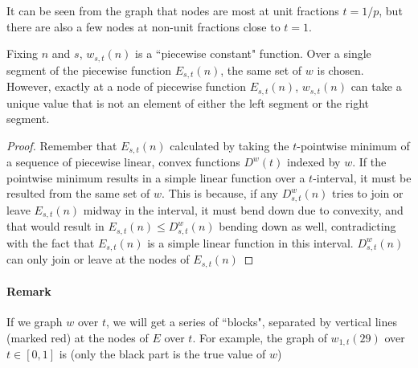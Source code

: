 \documentclass[]{article}
\begin{document}
It can be seen from the graph that nodes are most at unit fractions $t = 1/p$, but there are also a few nodes at non-unit fractions close to $t=1$.
\vspace{1cm}
\begin{lemma}[$w$ segment]
	Fixing $n$ and $s$, $w_{s,t}(n)$ is a ``piecewise constant" function. Over a single segment of the piecewise function $E_{s,t}(n)$, the same set of $w$ is chosen. However, exactly at a node of piecewise function $E_{s,t}(n)$, $w_{s,t}(n)$ can take a unique value that is not an element of either the left segment or the right segment.
\end{lemma}
\begin{proof}
	Remember that $E_{s,t}(n)$ calculated by taking the $t$-pointwise minimum of a sequence of piecewise linear, convex functions $D^w(t)$ indexed by $w$. If the pointwise minimum results in a simple linear function over a $t$-interval, it must be resulted from the same set of $w$. This is because, if any $D^w_{s,t}(n)$ tries to join or leave $E_{s,t}(n)$ midway in the interval, it must bend down due to convexity, and that would result in  $E_{s,t}(n) \le D^w_{s,t}(n)$ bending down as well, contradicting with the fact that $E_{s,t}(n)$ is a simple linear function in this interval. $D^w_{s,t}(n)$ can only join or leave at the nodes of $E_{s,t}(n)$
\end{proof}

\paragraph{Remark}

If we graph $w$ over $t$, we will get a series of ``blocks", separated by vertical lines (marked red) at the nodes of $E$ over $t$. For example, the graph of $w_{1,t}(29)$ over $t\in[0,1]$ is (only the black part is the true value of $w$)
\end{document}
